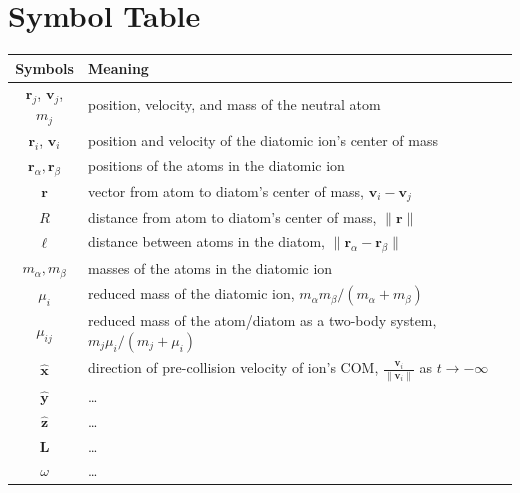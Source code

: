 \documentclass[article]{revtex4-2}
\begin{document}
\section{Symbol Table}
\label{sec:symbol_table}
\begin{center}
\begin{tabular}{|| c || l ||} 
 \hline
 Symbols & Meaning \\ [0.5ex] 
 \hline \hline
 $\mathbf{r}_j$, $\mathbf{v}_j$, $m_j$ & position, velocity, and mass of the neutral atom  \\ \hline
 $\mathbf{r}_i$, $\mathbf{v}_i$ & position and velocity of the diatomic ion's center of mass  \\ \hline
 $\mathbf{r}_\alpha, \mathbf{r}_\beta$ & positions of the atoms in the diatomic ion  \\ \hline
 $\mathbf{r}$ & vector from atom to diatom's center of mass, $\mathbf{v}_i - \mathbf{v}_j$ \\ \hline
 $R$ & distance from atom to diatom's center of mass, $\| \mathbf{r} \|$ \\ \hline
 $\ell$ & distance between atoms in the diatom, $\| \mathbf{r}_\alpha - \mathbf{r}_\beta \|$ \\ \hline
 $m_\alpha, m_\beta$ & masses of the atoms in the diatomic ion \\ \hline
 $\mu_i$ & reduced mass of the diatomic ion, $m_\alpha m_\beta / (m_\alpha + m_\beta)$ \\ \hline
 $\mu_{ij}$ & reduced mass of the atom/diatom as a two-body system, $m_j \mu_i / (m_j + \mu_i)$ \\ \hline
 $\mathbf{\widehat{x}}$ & direction of pre-collision velocity of ion's COM, $\frac{\mathbf{v}_i}{\| \mathbf{v}_i\|}$ as $t\rightarrow -\infty$ \\ \hline
 $\mathbf{\hat{y}}$ & \ldots \\ \hline
 $\mathbf{\hat{z}}$ & \ldots \\ \hline
 $\mathbf{L}$ & \ldots \\ \hline
 $\omega$ & \ldots \\ \hline
\end{tabular}
\end{center}


\end{document}
